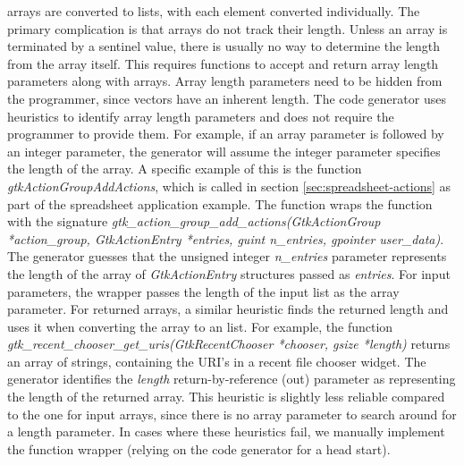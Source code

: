 \documentclass[article]{jss}
\begin{document}
 arrays are converted to  lists, 
with each
element
converted individually. The primary complication is that 
arrays 
do not track their length. Unless an array is terminated by a sentinel
value,
there is usually no way to determine the length from the array itself.
This 
requires  functions to accept and return array length
parameters
along with arrays. Array length parameters need to be hidden from the
 programmer, since  vectors have an inherent
length.
The code generator uses heuristics to identify array length parameters
and
does not require the  programmer to provide them. 
For
example,
if an array parameter is followed by an integer parameter, the
generator
will assume the integer parameter specifies the length of the array.
A specific example of this is the function \emph{gtkActionGroupAddActions}, which is called in section \ref{sec:spreadsheet-actions} as part of the spreadsheet application example. The function wraps the  function with the signature \emph{gtk\_action\_group\_add\_actions(GtkActionGroup *action_group, GtkActionEntry *entries, guint n\_entries, gpointer user\_data)}. The generator guesses that the unsigned integer \emph{n\_entries} parameter represents the length of the array of \emph{GtkActionEntry} structures passed as \emph{entries}. 
For input parameters, the wrapper passes the length of the input  list as the array parameter. For returned arrays, a similar heuristic finds the returned length and uses it when converting the array to an  list. For example, the  function \emph{gtk\_recent\_chooser\_get\_uris(GtkRecentChooser *chooser, gsize *length)} returns an array of strings, containing the URI's in a recent file chooser widget. The generator identifies the \emph{length} return-by-reference (out) parameter as representing the length of the returned array. This heuristic is slightly less reliable compared to the one for input arrays, since there is no array parameter to search around for a length parameter.
In cases where these heuristics fail, we manually implement the function wrapper (relying on the code generator for a head start).
\end{document}
